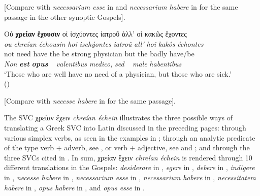 \documentclass[output=paper,colorlinks,citecolor=brown]{langscibook}
\begin{document}
{[}Compare with \emph{necessarium esse} in  and \emph{necessarium habere} in  for the same passage in the other synoptic Gospels{]}.

\ex\label{ex:bj:22c}

\gllll Οὐ \textbf{χρείαν} \textbf{ἔχουσιν} οἱ ἰσχύοντες ἰατροῦ ἀλλ' οἱ κακῶς ἔχοντες\\
 \textit{ou} \textit{chreían} \textit{échousin} \textit{hoi} \textit{ischýontes} \textit{iatroû} \textit{all'} \textit{hoi} \textit{kakôs} \textit{échontes}\\
not need have the {be strong} physician but the badly have/be\\
\emph{Non} \textbf{\itshape est} \textbf{\itshape opus} ~ \emph{valentibus} \emph{medico,}
\emph{sed} ~ \emph{male} \emph{habentibus}\\
\glt `Those who are well have no need of a physician, but those who are sick.' \\
\hspace*{\fill}() 


{[}Compare with \emph{necesse habere} in  for the same passage{]}.

\z

\z

The SVC χρείαν ἔχειν \emph{chreían échein} illustrates the three possible ways of
translating a Greek SVC into Latin discussed in the preceding pages: through various
simplex verbs, as seen in the examples in ; through an analytic predicate of
the type verb + adverb, see , or verb + adjective, see  and
; and through the three SVCs cited in . In sum, χρείαν
ἔχειν \emph{chreían échein} is rendered through 10 different translations in the
Gospels: \emph{desiderare} in , \emph{egere} in , \emph{debere} in
, \emph{indigere} in , \emph{necesse habere} in ,
\emph{necessarium esse} in , \emph{necessarium habere} in ,
\emph{necessitatem habere} in , \emph{opus habere} in , and
\emph{opus esse} in .
\end{document}

